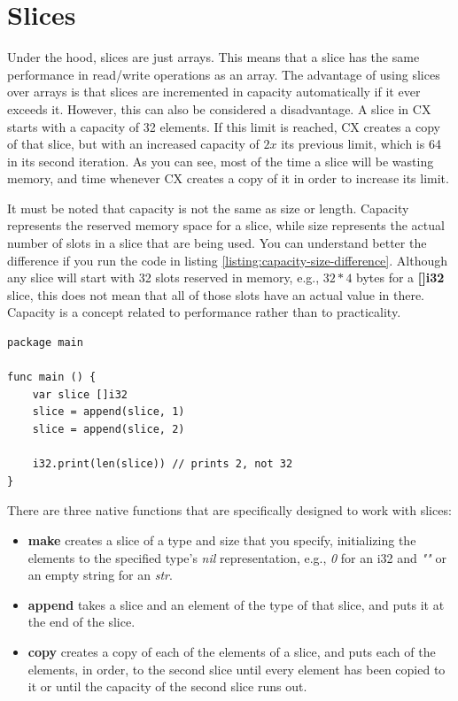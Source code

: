 \documentclass[11pt,fleqn,openany]{book} %
\begin{document}
\section{Slices}

Under the hood, slices are just arrays. This means that a slice has the same performance in read/write operations as an array. The advantage of using slices over arrays is that slices are incremented in capacity automatically if it ever exceeds it. However, this can also be considered a disadvantage. A slice in CX starts with a capacity of 32 elements. If this limit is reached, CX creates a copy of that slice, but with an increased capacity of $2x$ its previous limit, which is 64 in its second iteration. As you can see, most of the time a slice will be wasting memory, and time whenever CX creates a copy of it in order to increase its limit.

It must be noted that capacity is not the same as size or length. Capacity represents the reserved memory space for a slice, while size represents the actual number of slots in a slice that are being used. You can understand better the difference if you run the code in listing \ref{listing:capacity-size-difference}. Although any slice will start with 32 slots reserved in memory, e.g., $32*4$ bytes for a \textbf{[]i32} slice, this does not mean that all of those slots have an actual value in there. Capacity is a concept related to performance rather than to practicality.

\begin{lstlisting}[caption={Difference between capacity and size},captionpos=b,label={listing:capacity-size-difference}]
package main

func main () {
	var slice []i32
    slice = append(slice, 1)
    slice = append(slice, 2)
    
    i32.print(len(slice)) // prints 2, not 32
}
\end{lstlisting}

There are three native functions that are specifically designed to work with slices:
\begin{itemize}
    \item \textbf{make} creates a slice of a type and size that you specify, initializing the elements to the specified type's \emph{nil} representation, e.g., \emph{0} for an i32 and \emph{""} or an empty string for an \emph{str}.
    \item \textbf{append} takes a slice and an element of the type of that slice, and puts it at the end of the slice.
    \item \textbf{copy} creates a copy of each of the elements of a slice, and puts each of the elements, in order, to the second slice until every element has been copied to it or until the capacity of the second slice runs out.
\end{itemize}
\end{document}
